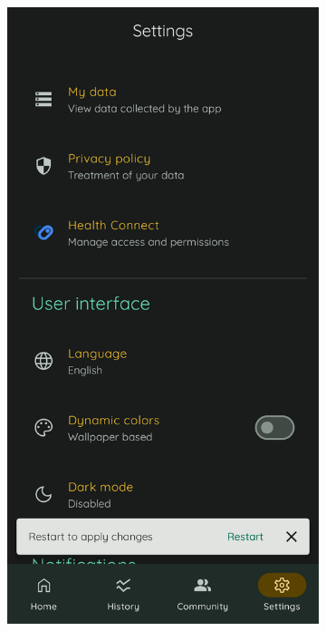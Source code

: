            \begin{figure}[htbp]
                \centering
                \begin{subfigure}[c]{0.4\textwidth}
                    \centering
                    \includegraphics[width=1\textwidth]{figures/pruebas/modo_claro/Antes.png}

\end{subfigure}
\end{figure}

